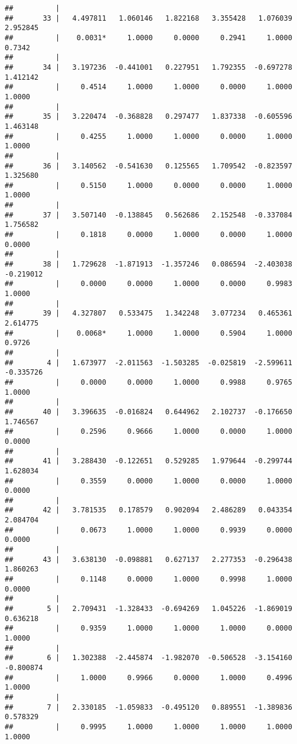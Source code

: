 \documentclass[12pt,]{article}
\begin{document}
\begin{verbatim}
##          |
##       33 |   4.497811   1.060146   1.822168   3.355428   1.076039   2.952845
##          |    0.0031*     1.0000     0.0000     0.2941     1.0000     0.7342
##          |
##       34 |   3.197236  -0.441001   0.227951   1.792355  -0.697278   1.412142
##          |     0.4514     1.0000     1.0000     0.0000     1.0000     1.0000
##          |
##       35 |   3.220474  -0.368828   0.297477   1.837338  -0.605596   1.463148
##          |     0.4255     1.0000     1.0000     0.0000     1.0000     1.0000
##          |
##       36 |   3.140562  -0.541630   0.125565   1.709542  -0.823597   1.325680
##          |     0.5150     1.0000     0.0000     0.0000     1.0000     1.0000
##          |
##       37 |   3.507140  -0.138845   0.562686   2.152548  -0.337084   1.756582
##          |     0.1818     0.0000     1.0000     0.0000     1.0000     0.0000
##          |
##       38 |   1.729628  -1.871913  -1.357246   0.086594  -2.403038  -0.219012
##          |     0.0000     0.0000     1.0000     0.0000     0.9983     1.0000
##          |
##       39 |   4.327807   0.533475   1.342248   3.077234   0.465361   2.614775
##          |    0.0068*     1.0000     1.0000     0.5904     1.0000     0.9726
##          |
##        4 |   1.673977  -2.011563  -1.503285  -0.025819  -2.599611  -0.335726
##          |     0.0000     0.0000     1.0000     0.9988     0.9765     1.0000
##          |
##       40 |   3.396635  -0.016824   0.644962   2.102737  -0.176650   1.746567
##          |     0.2596     0.9666     1.0000     0.0000     1.0000     0.0000
##          |
##       41 |   3.288430  -0.122651   0.529285   1.979644  -0.299744   1.628034
##          |     0.3559     0.0000     1.0000     0.0000     1.0000     0.0000
##          |
##       42 |   3.781535   0.178579   0.902094   2.486289   0.043354   2.084704
##          |     0.0673     1.0000     1.0000     0.9939     0.0000     0.0000
##          |
##       43 |   3.638130  -0.098881   0.627137   2.277353  -0.296438   1.860263
##          |     0.1148     0.0000     1.0000     0.9998     1.0000     0.0000
##          |
##        5 |   2.709431  -1.328433  -0.694269   1.045226  -1.869019   0.636218
##          |     0.9359     1.0000     1.0000     1.0000     0.0000     1.0000
##          |
##        6 |   1.302388  -2.445874  -1.982070  -0.506528  -3.154160  -0.800874
##          |     1.0000     0.9966     0.0000     1.0000     0.4996     1.0000
##          |
##        7 |   2.330185  -1.059833  -0.495120   0.889551  -1.389836   0.578329
##          |     0.9995     1.0000     1.0000     1.0000     1.0000     1.0000

\end{verbatim}
\end{document}
